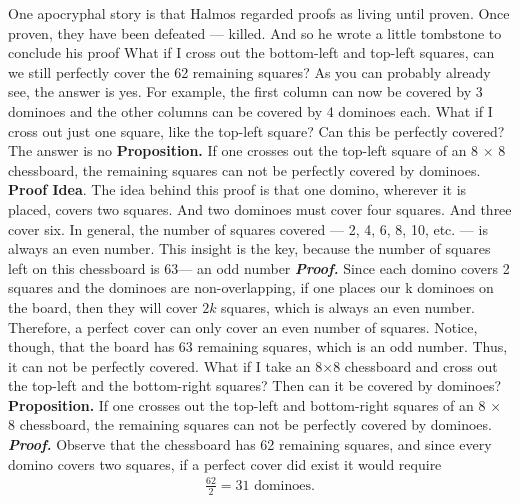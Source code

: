 \documentclass{report}
\begin{document}
\begin{itemize}
            \bigbreak \noindent 
            One apocryphal story is that Halmos regarded proofs as living until proven. Once proven, they have been defeated — killed. And so he wrote a little tombstone to conclude his proof
            \bigbreak \noindent 
            What if I cross out the bottom-left and top-left squares, can we still perfectly cover the 62 remaining squares?
            \bigbreak \noindent 
            As you can probably already see, the answer is yes. For example, the first column can now be covered by 3 dominoes and the other columns can be covered by 4 dominoes each.
            \bigbreak \noindent 
            What if I cross out just one square, like the top-left square? Can this be perfectly covered? 
            \bigbreak \noindent 
            The answer is no
            \bigbreak \noindent 
            \textbf{Proposition.} If one crosses out the top-left square of an 8 $\times$ 8 chessboard, the remaining squares can not be perfectly covered by dominoes.
            \bigbreak \noindent 
            \textbf{Proof Idea}. The idea behind this proof is that one domino, wherever it is placed, covers two squares. And two dominoes must cover four squares. And three cover six. In general, the number of squares covered — 2, 4, 6, 8, 10, etc. — is always an even number. This insight is the key, because the number of squares left on this chessboard is 63— an odd number
            \bigbreak \noindent 
            \textbf{\textit{Proof.}} Since each domino covers 2 squares and the dominoes are non-overlapping, if one places our k dominoes on the board, then they will cover $2k$ squares, which is always an even number. Therefore, a perfect cover can only cover an even number of squares. Notice, though, that the board has 63 remaining squares, which is an odd number. Thus, it can not be perfectly covered.
            \bigbreak \noindent 
            What if I take an 8$\times$8 chessboard and cross out the top-left and the bottom-right squares? Then can it be covered by dominoes?
            \bigbreak \noindent 
            \textbf{Proposition.} If one crosses out the top-left and bottom-right squares of an 8 $\times$ 8 chessboard, the remaining squares can not be perfectly covered by dominoes.
            \bigbreak \noindent 
            \textbf{\textit{Proof.}} Observe that the chessboard has 62 remaining squares, and since every domino covers two squares, if a perfect cover did exist it would require
            \begin{align*}
                \frac{62}{2} = 31 \text{ dominoes}
            .\end{align*}

\end{itemize}
\end{document}
